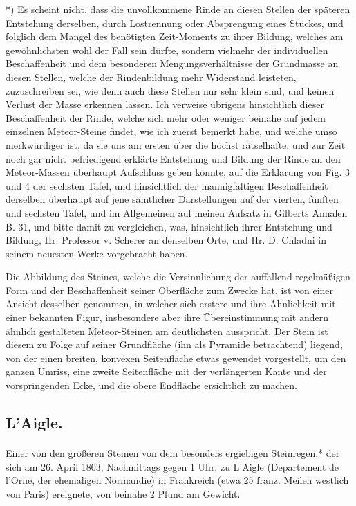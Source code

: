 \documentclass[a4paper, 11pt, oneside, german]{article}
\begin{document}
*) Es scheint nicht, dass die unvollkommene Rinde an diesen Stellen der späteren Entstehung derselben, durch Lostrennung oder Absprengung eines Stückes, und folglich dem Mangel des benötigten Zeit-Moments zu ihrer Bildung, welches am gewöhnlichsten wohl der Fall sein dürfte, sondern vielmehr der individuellen Beschaffenheit und dem besonderen Mengungsverhältnisse der Grundmasse an diesen Stellen, welche der Rindenbildung mehr Widerstand leisteten, zuzuschreiben sei, wie denn auch diese Stellen nur sehr klein sind, und keinen Verlust der Masse erkennen lassen. Ich verweise übrigens hinsichtlich dieser Beschaffenheit der Rinde, welche sich mehr oder weniger beinahe auf jedem einzelnen Meteor-Steine findet, wie ich zuerst bemerkt habe, und welche umso merkwürdiger ist, da sie uns am ersten über die höchst rätselhafte, und zur Zeit noch gar nicht befriedigend erklärte Entstehung und Bildung der Rinde an den Meteor-Massen überhaupt Aufschluss geben könnte, auf die Erklärung von Fig. 3 und 4 der sechsten Tafel, und hinsichtlich der mannigfaltigen Beschaffenheit derselben überhaupt auf jene sämtlicher Darstellungen auf der vierten, fünften und sechsten Tafel, und im Allgemeinen auf meinen Aufsatz in Gilberts Annalen B. 31, und bitte damit zu vergleichen, was, hinsichtlich ihrer Entstehung und Bildung, Hr. Professor v. Scherer an denselben Orte, und Hr. D. Chladni in seinem neuesten Werke vorgebracht haben.

Die Abbildung des Steines, welche die Versinnlichung der auffallend regelmäßigen Form und der Beschaffenheit seiner Oberfläche zum Zwecke hat, ist von einer Ansicht desselben genommen, in welcher sich erstere und ihre Ähnlichkeit mit einer bekannten Figur, insbesondere aber ihre Übereinstimmung mit andern ähnlich gestalteten Meteor-Steinen am deutlichsten ausspricht. Der Stein ist diesem zu Folge auf seiner Grundfläche (ihn als Pyramide betrachtend) liegend, von der einen breiten, konvexen Seitenfläche etwas gewendet vorgestellt, um den ganzen Umriss, eine zweite Seitenfläche mit der verlängerten Kante und der vorspringenden Ecke, und die obere Endfläche ersichtlich zu machen.

\subsection{L'Aigle.}
\paragraph{}
Einer von den größeren Steinen von dem besonders ergiebigen Steinregen,* der sich am 26. April 1803, Nachmittags gegen 1 Uhr, zu L'Aigle (Departement de l'Orne, der ehemaligen Normandie) in Frankreich (etwa 25 franz. Meilen westlich von Paris) ereignete, von beinahe 2 Pfund am Gewicht.
\end{document}
